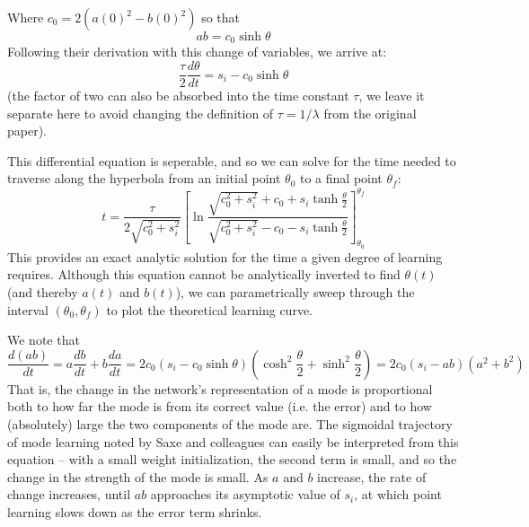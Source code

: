 \documentclass{article}
\begin{document}
Where $c_0 = 2 (a(0)^2-b(0)^2)$ so that
$$ab = c_0 \sinh \theta$$
Following their derivation with this change of variables, we arrive at:
$$\frac{\tau}{2} \frac{d\theta}{dt} = s_i - c_0 \sinh \theta$$
(the factor of two can also be absorbed into the time constant $\tau$, we leave it separate here to avoid changing the definition of $\tau = 1/\lambda$ from the original paper). \par
This differential equation is seperable, and so we can solve for the time needed to traverse along the hyperbola from an initial point $\theta_0$ to a final point $\theta_f$:
$$t = \frac{\tau}{2\sqrt{c_0^2 + s_i^2}} \left[\ln \frac{\sqrt{c_0^2 + s_i^2} + c_0 + s_i \tanh \frac{\theta}{2}}{\sqrt{c_0^2 + s_i^2} - c_0 - s_i \tanh \frac{\theta}{2}}\right]_{\theta_0}^{\theta_f}$$
This provides an exact analytic solution for the time a given degree of learning requires. Although this equation cannot be analytically inverted to find $\theta(t)$ (and thereby $a(t)$ and $b(t)$), we can parametrically sweep through the interval $(\theta_0, \theta_f)$ to plot the theoretical learning curve. \par
We note that 
$$\frac{d(ab)}{dt} = a \frac{db}{dt} + b \frac{da}{dt} = 2 c_0 (s_i - c_0 \sinh \theta) \left( \cosh^2 \frac{\theta}{2} + \sinh^2 \frac{\theta}{2} \right) = 2 c_0 \left(s_i - ab\right) \left(a^2 + b^2 \right)$$
That is, the change in the network's representation of a mode is proportional both to how far the mode is from its correct value (i.e. the error) and to how (absolutely) large the two components of the mode are. The sigmoidal trajectory of mode learning noted by Saxe and colleagues can easily be interpreted from this equation -- with a small weight initialization, the second term is small, and so the change in the strength of the mode is small. As $a$ and $b$ increase, the rate of change increases, until $ab$ approaches its asymptotic value of $s_i$, at which point learning slows down as the error term shrinks. \par
\end{document}
